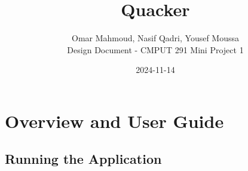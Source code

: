 \documentclass[12pt]{article}
\begin{document}
\title{\huge Quacker}
\author{Omar Mahmoud,  Nasif Qadri,  Yousef Moussa\\[0.5cm] 
Design Document - CMPUT 291 Mini Project 1\\}
\date{2024-11-14}

\maketitle
\newpage


\section{Overview and User Guide}
	\subsection*{Running the Application}
\end{document}
